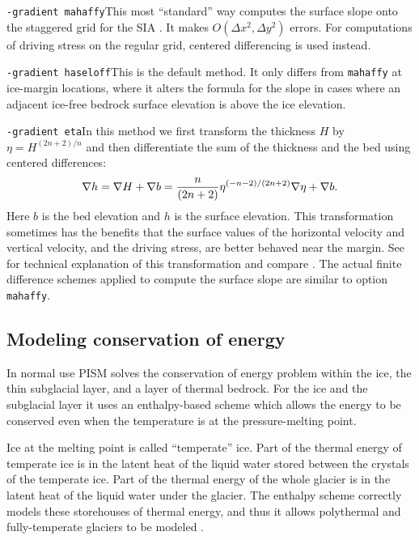 \noindent\texttt{-gradient mahaffy}\quad  This most ``standard'' way computes the surface slope onto the staggered grid for the SIA \cite{Mahaffy}.  It makes $O(\Delta x^2,\Delta y^2)$ errors.  For computations of driving stress on the regular grid, centered differencing is used instead.

\noindent\texttt{-gradient haseloff}\quad  This is the default method.  It only differs from \texttt{mahaffy} at ice-margin locations, where it alters the formula for the slope in cases where an adjacent ice-free bedrock surface elevation is above the ice elevation.

\noindent\texttt{-gradient eta}\quad  In this method we first transform the thickness $H$ by $\eta = H^{(2n+2)/n}$ and then differentiate the sum of the thickness and the bed using centered differences:
	$$\nabla h = \nabla H + \nabla b = \frac{n}{(2n+2)} \eta^{(-n-2)/(2n+2)} \nabla \eta + \nabla b.$$
Here $b$ is the bed elevation and $h$ is the surface elevation.  This transformation sometimes has the benefits that the surface values of the horizontal velocity and vertical velocity, and the driving stress, are better behaved near the margin.  See \cite{BLKCB} for technical explanation of this transformation and compare \cite{SaitoMargin}.  The actual finite difference schemes applied to compute the surface slope are similar to option \texttt{mahaffy}.


\subsection{Modeling conservation of energy} \label{subsect:energy}

In normal use PISM solves the conservation of energy problem within the ice, the thin subglacial layer, and a layer of thermal bedrock.  For the ice and the subglacial layer it uses an enthalpy-based scheme \cite{AschwandenBuelerKhroulevBlatter} which allows the energy to be conserved even when the temperature is at the pressure-melting point.

Ice at the melting point is called ``temperate'' ice.  Part of the thermal energy of temperate ice is in the latent heat of the liquid water stored between the crystals of the temperate ice.  Part of the thermal energy of the whole glacier is in the latent heat of the liquid water under the glacier.  The enthalpy scheme correctly models these storehouses of thermal energy, and thus it allows polythermal and fully-temperate glaciers to be modeled \cite{AschwandenBlatter}.

